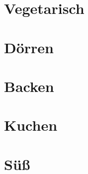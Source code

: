 \documentclass[11pt, DIV=15, twoside=false]{scrbook}
\begin{document}
\part{Vegetarisch}




\part{Dörren}


\part{Backen}




\part{Kuchen}





\part{Süß}







	
\end{document}
